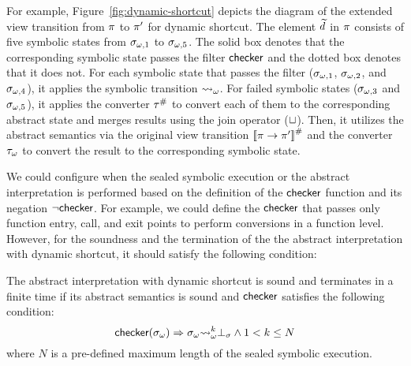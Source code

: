 For example, Figure~\ref{fig:dynamic-shortcut} depicts the
diagram of the extended view transition from $\pi$ to $\pi'$ for dynamic
shortcut.  The element $\widetilde{d}$ in $\pi$ consists of five symbolic states
from $\sigma_{\omega,1}$ to $\sigma_{\omega,5}$.  The solid box denotes that the corresponding
symbolic state passes the filter $\textsf{checker}$ and the dotted box denotes that it
does not.  For each symbolic state that passes the filter ($\sigma_{\omega,1}$,
$\sigma_{\omega,2}$, and $\sigma_{\omega,4}$), it applies the symbolic transition ${\leadsto}_\omega$.
For failed symbolic states ($\sigma_{\omega,3}$ and $\sigma_{\omega,5}$), it applies the
converter ${\tau}^{\#}$ to convert each of them to the corresponding abstract
state and merges results using the join operator ($\sqcup$).  Then, it utilizes
the abstract semantics via the original view transition
${[\![{\pi \rightarrow \pi'}]\!]}^{\#}$ and the converter ${\tau}_\omega$ to convert the
result to the corresponding symbolic state.

We could configure when the sealed symbolic execution or the abstract
interpretation is performed based on the definition of the $\textsf{checker}$ function
and its negation $\neg\textsf{checker}$.  For example, we could define the $\textsf{checker}$
that passes only function entry, call, and exit points to perform conversions in
a function level.  However, for the soundness and the termination of the
the abstract interpretation with dynamic shortcut, it should satisfy the
following condition:
\begin{theorem}\label{theorem:shortcut}
  The abstract interpretation with dynamic shortcut is sound and terminates in a
  finite time if its abstract semantics is sound and $\textsf{checker}$ satisfies the
  following condition:
  \[
    \textsf{checker}({\sigma}_\omega) \Rightarrow {\sigma}_\omega {\leadsto}_\omega^k \bot_\sigma \wedge
    1 < k \leq N
  \]
  where $N$ is a pre-defined maximum length of the sealed symbolic execution.
\end{theorem}
